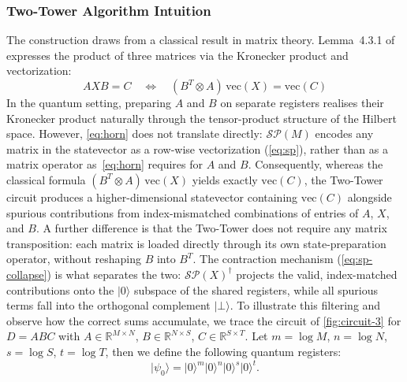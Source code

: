\documentclass[a4paper,UKenglish,cleveref,autoref,thm-restate]{socg-lipics-v2021}
\providecommand{\ket}[1]{\lvert #1 \rangle}
\newcommand{\SP}{\mathcal{SP}}        %
\begin{document}
\subsubsection{Two-Tower Algorithm Intuition}
\label{sec:algorithm:walkthrough}
The construction draws from a classical result in matrix theory. Lemma~4.3.1 of~\cite{horn2012matrix} expresses the product of three matrices via the Kronecker product and vectorization:
\begin{equation}\label{eq:horn}
AXB = C \quad\Longleftrightarrow\quad (B^T\otimes A)\,\text{vec}(X) = \text{vec}(C)
\end{equation}
In the quantum setting, preparing $A$ and $B$ on separate registers realises their Kronecker product naturally through the tensor-product structure of the Hilbert space. However, \cref{eq:horn} does not translate directly: $\SP(M)$ encodes any matrix in the statevector as a row-wise vectorization (\cref{eq:sp}), rather than as a matrix operator as~\cref{eq:horn} requires for $A$ and $B$. Consequently, whereas the classical formula $(B^T\otimes A)\,\text{vec}(X)$ yields exactly $\text{vec}(C)$, the Two-Tower circuit produces a higher-dimensional statevector containing $\text{vec}(C)$ alongside spurious contributions from index-mismatched combinations of entries of $A$, $X$, and $B$. A further difference is that the Two-Tower does not require any matrix transposition: each matrix is loaded directly through its own state-preparation operator, without reshaping $B$ into $B^T$. The contraction mechanism (\cref{eq:sp-collapse}) is what separates the two: $\SP(X)^\dagger$ projects the valid, index-matched contributions onto the $\ket{0}$ subspace of the shared registers, while all spurious terms fall into the orthogonal complement $\ket{\bot}$. To illustrate this filtering and observe how the correct sums accumulate, we trace the circuit of \cref{fig:circuit-3} for $D = ABC$ with $A \in \mathbb{R}^{M \times N}$, $B \in \mathbb{R}^{N \times S}$, $C \in \mathbb{R}^{S \times T}$. Let $m = \log M$, $n = \log N$, $s = \log S$, $t = \log T$, then we define the following quantum registers:
\begin{equation*}\label{eq:psi0-3}
  \ket{\psi_0} = \ket{0}^{m}\ket{0}^{n}\ket{0}^{s}\ket{0}^{t}.
\end{equation*}
\end{document}
